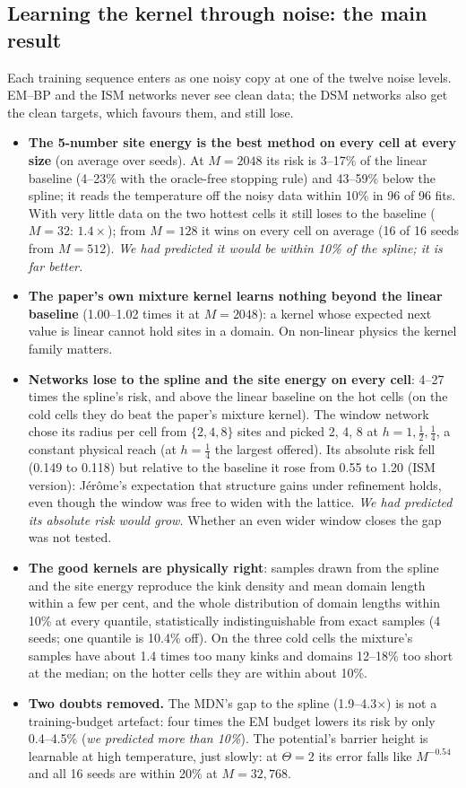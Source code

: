 \documentclass[11pt,a4paper]{article}
\newcommand{\fals}[1]{{\small\itshape #1}}
\begin{document}
\subsection{Learning the kernel through noise: the main result}

Each training sequence enters as one noisy copy at one of the twelve noise levels. EM--BP and the ISM networks never see clean
data; the DSM networks also get the clean targets, which favours them, and still lose.
\begin{itemize}
\item \textbf{The 5-number site energy is the best method on every cell at every size} (on average over seeds). At $M=2048$ its risk is
3--17\% of the linear baseline (4--23\% with the oracle-free stopping rule) and 43--59\% below the spline; it reads the temperature off
the noisy data within 10\% in 96 of 96 fits. With very little data on the two hottest cells it still loses to the baseline ($M=32$: $1.4\times$); from
$M=128$ it wins on every cell on average (16 of 16 seeds from $M=512$). \fals{We had predicted it would be within 10\% of the
spline; it is far better.}
\item \textbf{The paper's own mixture kernel learns nothing beyond the linear baseline} (1.00--1.02 times it at $M=2048$): a kernel whose
expected next value is linear cannot hold sites in a domain. On non-linear physics the kernel family matters.
\item \textbf{Networks lose to the spline and the site energy on every cell}: 4--27 times the spline's risk, and above the linear
baseline on the hot cells (on the cold cells they do beat the paper's mixture kernel). The window network chose its radius per cell from $\{2,4,8\}$ sites and picked 2, 4, 8 at $h=1,\tfrac12,\tfrac14$, a constant
physical reach (at $h=\tfrac14$ the largest offered). Its absolute risk fell (0.149 to 0.118) but relative to the baseline it rose from
0.55 to 1.20 (ISM version): Jérôme's expectation that structure gains under refinement holds, even though the window was free to
widen with the lattice. \fals{We had predicted its absolute risk would
grow.} Whether an even wider window closes the gap was not tested.
\item \textbf{The good kernels are physically right}: samples drawn from the spline and the site energy reproduce the kink density and
mean domain length within a few per cent, and the whole distribution of domain lengths within 10\% at every quantile,
statistically indistinguishable from exact samples (4 seeds; one quantile is 10.4\% off). On the three cold cells the mixture's
samples have about 1.4 times too many kinks and domains 12--18\% too short at the median; on the hotter cells they are within
about 10\%.
\item \textbf{Two doubts removed.} The MDN's gap to the spline (1.9--4.3$\times$) is not a training-budget artefact: four times the EM budget lowers its risk by only
0.4--4.5\% (\fals{we predicted more than 10\%}). The potential's barrier height is learnable at high temperature, just slowly: at
$\Theta=2$ its error falls like $M^{-0.54}$ and all 16 seeds are within 20\% at $M=32{,}768$.
\end{itemize}
\end{document}
